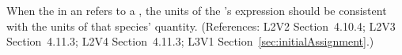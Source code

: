 When the  in an \InitialAssignment refers to a \Species,
the units of the \InitialAssignment's  expression should be
consistent with the units of that species' quantity.  (References:
L2V2 Section~4.10.4; L2V3 Section~4.11.3; L2V4 Section~4.11.3; 
L3V1 Section~\ref{sec:initialAssignment}.)
